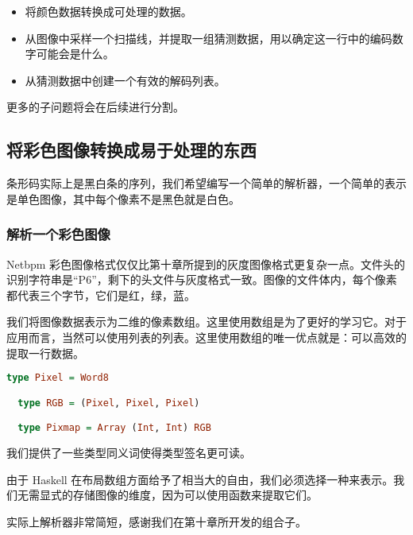 \documentclass[./main.tex]{subfiles}
\begin{document}
\begin{itemize}
  \item 将颜色数据转换成可处理的数据。
  \item 从图像中采样一个扫描线，并提取一组猜测数据，用以确定这一行中的编码数字可能会是什么。
  \item 从猜测数据中创建一个有效的解码列表。
\end{itemize}

更多的子问题将会在后续进行分割。

\subsection*{将彩色图像转换成易于处理的东西}

条形码实际上是黑白条的序列，我们希望编写一个简单的解析器，一个简单的表示是单色图像，其中每个像素不是黑色就是白色。

\subsubsection*{解析一个彩色图像}

Netbpm 彩色图像格式仅仅比第十章所提到的灰度图像格式更复杂一点。文件头的识别字符串是“P6”，剩下的头文件与灰度格式一致。图像的文件体内，每个像素
都代表三个字节，它们是红，绿，蓝。

我们将图像数据表示为二维的像素数组。这里使用数组是为了更好的学习它。对于应用而言，当然可以使用列表的列表。这里使用数组的唯一优点就是：可以高效的
提取一行数据。

\begin{lstlisting}[language=Haskell]
  type Pixel = Word8

  type RGB = (Pixel, Pixel, Pixel)

  type Pixmap = Array (Int, Int) RGB
\end{lstlisting}

我们提供了一些类型同义词使得类型签名更可读。

由于 Haskell 在布局数组方面给予了相当大的自由，我们必须选择一种来表示。我们无需显式的存储图像的维度，因为可以使用函数来提取它们。

实际上解析器非常简短，感谢我们在第十章所开发的组合子。
\end{document}
